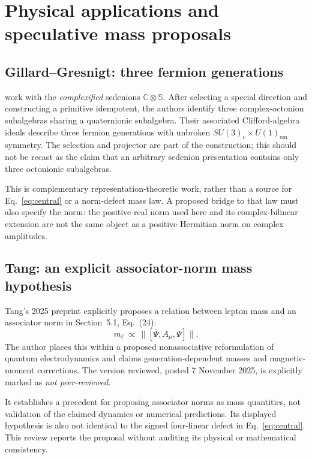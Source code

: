 \documentclass[11pt,a4paper]{article}
\newcommand{\C}{\mathbb C}
\newcommand{\SSS}{\mathbb S}
\numberwithin{equation}{section}
\begin{document}
\section{Physical applications and speculative mass proposals}

\subsection{Gillard--Gresnigt: three fermion generations}

\citet{GillardGresnigt2019Generations} work with the
\emph{complexified} sedenions $\C\otimes\SSS$.
After selecting a special direction and constructing a primitive
idempotent, the authors identify three complex-octonion subalgebras
sharing a quaternionic subalgebra. Their associated Clifford-algebra
ideals describe three fermion generations with unbroken
$SU(3)_c\times U(1)_{\mathrm{em}}$ symmetry.
The selection and projector are part of the construction; this should
not be recast as the claim that an arbitrary sedenion presentation
contains only three octonionic subalgebras.
\citep[Abstract]{GillardGresnigt2019Generations}

This is complementary representation-theoretic work, rather than a
source for Eq.~\eqref{eq:central} or a norm-defect mass law. A proposed
bridge to that law must also specify the norm: the positive real norm
used here and its complex-bilinear extension are not the same object
as a positive Hermitian norm on complex amplitudes.

\subsection{Tang: an explicit associator-norm mass hypothesis}

Tang's 2025 preprint explicitly proposes a relation between lepton mass
and an associator norm in Section~5.1, Eq.~(24):
\begin{equation}
 m_{\ell}\ \propto\
 \bigl\|[\overline{\Psi},A_{\mu},\Psi]\bigr\|.
\end{equation}
The author places this within a proposed nonassociative reformulation
of quantum electrodynamics and claims generation-dependent masses and
magnetic-moment corrections. The version reviewed, posted
7 November 2025, is explicitly marked as \emph{not peer-reviewed}.
\citep[Sec.~5.1, Eq.~(24)]{Tang2025AssociatorMass}

It establishes a precedent for proposing associator norms as mass
quantities, not validation of the claimed dynamics or numerical
predictions. Its displayed hypothesis is also not identical to the
signed four-linear defect in Eq.~\eqref{eq:central}. This review reports
the proposal without auditing its physical or mathematical consistency.
\end{document}
